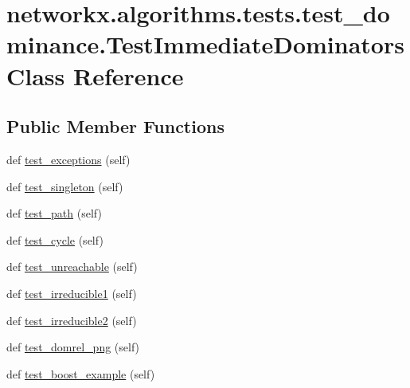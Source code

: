 \hypertarget{classnetworkx_1_1algorithms_1_1tests_1_1test__dominance_1_1TestImmediateDominators}{}\section{networkx.\+algorithms.\+tests.\+test\+\_\+dominance.\+Test\+Immediate\+Dominators Class Reference}
\label{classnetworkx_1_1algorithms_1_1tests_1_1test__dominance_1_1TestImmediateDominators}
\subsection*{Public Member Functions}
\begin{DoxyCompactItemize}
\item 
def \hyperlink{classnetworkx_1_1algorithms_1_1tests_1_1test__dominance_1_1TestImmediateDominators_ab65149608e05ffc9b3b0fa934f941133}{test\+\_\+exceptions} (self)
\item 
def \hyperlink{classnetworkx_1_1algorithms_1_1tests_1_1test__dominance_1_1TestImmediateDominators_a84828d81ebbcff6e5e2dc24044230f9e}{test\+\_\+singleton} (self)
\item 
def \hyperlink{classnetworkx_1_1algorithms_1_1tests_1_1test__dominance_1_1TestImmediateDominators_aa0cef0f071489c7384cb5c6c82873526}{test\+\_\+path} (self)
\item 
def \hyperlink{classnetworkx_1_1algorithms_1_1tests_1_1test__dominance_1_1TestImmediateDominators_aa307e1271697739618ac801d9edac384}{test\+\_\+cycle} (self)
\item 
def \hyperlink{classnetworkx_1_1algorithms_1_1tests_1_1test__dominance_1_1TestImmediateDominators_adc1accea68055a372ab500bf9c352f30}{test\+\_\+unreachable} (self)
\item 
def \hyperlink{classnetworkx_1_1algorithms_1_1tests_1_1test__dominance_1_1TestImmediateDominators_a36651b4cd50a5c26580222ae7304f160}{test\+\_\+irreducible1} (self)
\item 
def \hyperlink{classnetworkx_1_1algorithms_1_1tests_1_1test__dominance_1_1TestImmediateDominators_aadcad82c0e7873eeb40533115550b65e}{test\+\_\+irreducible2} (self)
\item 
def \hyperlink{classnetworkx_1_1algorithms_1_1tests_1_1test__dominance_1_1TestImmediateDominators_a11fdf01553ff9dcf98c01dc0d2dd139a}{test\+\_\+domrel\+\_\+png} (self)
\item 
def \hyperlink{classnetworkx_1_1algorithms_1_1tests_1_1test__dominance_1_1TestImmediateDominators_a1e9e1756e49b264a94c2201a123153e3}{test\+\_\+boost\+\_\+example} (self)
\end{DoxyCompactItemize}


